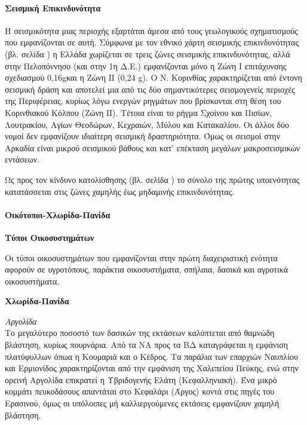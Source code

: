 \documentclass[12pt]{article}
\newcommand{\gr}{\selectlanguage{greek}}
\newcommand{\eng}{\selectlanguage{english}}
\begin{document}
 	\paragraph{Σεισμική Επικινδυνότητα}
 	
 	Η σεισμικότητα μιας περιοχής εξαρτάται άμεσα από τους γεωλογικούς σχηματισμούς που εμφανίζονται σε αυτή. Σύμφωνα με τον εθνικό χάρτη σεισμικής επικινδυνότητας (βλ. σελίδα \pageref{seismiki}) η Ελλάδα χωρίζεται σε τρεις ζώνες σεισμικής επικινδυνότητας, αλλά στην Πελοπόννησο (και στην 1η Δ.Ε.) εμφανίζονται μόνο η Ζώνη Ι επιτάχυνσης σχεδιασμού \eng0,16g\gr και η Ζώνη ΙΙ \eng(0,24 g)\gr. Ο Ν. Κορινθίας χαρακτηρίζεται από έντονη σεισμική δράση και αποτελεί μια από τις δύο σημαντικότερες σεισμογενείς περιοχές της Περιφέρειας, κυρίως λόγω ενεργών ρηγμάτων που βρίσκονται στη θέση του Κορινθιακού Κόλπου (Ζώνη ΙΙ). Τέτοια είναι το ρήγμα Σχοίνου και Πισίων, Λουτρακίου, Αγίων Θεοδώρων, Κεχραιών, Μύλου και Κατακαλίου. Οι άλλοι δύο νομοί δεν εμφανίζουν ιδιαίτερη σεισμική δραστηριότητα. Όμως οι σεισμοί στην Αρκαδία είναι μικρού σεισμικού βάθους και κατ’ επέκταση μεγάλων μακροσεισμικών εντάσεων.
 	
 	Ως προς τον κίνδυνο κατολίσθησης (βλ. σελίδα \pageref{katolisthiseis}) το σύνολο της πρώτης υποενότητας κατατάσσεται στις ζώνες χαμηλής έως μηδαμινής επικινδυνότητας.
 	
 	\paragraph{Οικότοποι-Χλωρίδα-Πανίδα}
 	
 	\textbf{Τύποι Οικοσυστημάτων}
 	
 	Οι τύποι οικοσυστημάτων που εμφανίζονται στην πρώτη διαχειριστική ενότητα αφορούν σε υγροτόπους, παράκτια οικοσυστήματα, σπήλαια, δασικά και αγροτικά οικοσυστήματα.
 	
 	\textbf{Χλωρίδα-Πανίδα} 
 		
		\emph{Αργολίδα} \\
		Το μεγαλύτερο ποσοστό των δασικών της εκτάσεων καλύπτεται από θαμνώδη βλάστηση, κυρίως πουρνάρια. Από τα ΝΑ προς τα ΒΔ καταγράφεται η  εμφάνιση πλατύφυλλων όπωα η Κουμαριά και ο Κέδρος. Τα παράλια των επαρχιών Ναυπλίου και Ερμιονίδος χαρακτηρίζονται από την εμφάνιση της Χαλεπείου Πεύκης, ενώ στην ορεινή Αργολίδα επικρατεί η Υβριδογενής Ελάτη (Κεφαλληνιακή). Ένα μικρό κομμάτι πευκοδάσους απαντάται στο Κεφαλάρι (Άργος) κοντά στις πηγές του Ερασινού, όμως οι υπόλοιπες μή καλλιεργούμενες εκτάσεις εμφανίζουν χαμηλή βλάστηση. 
		
\end{document}
